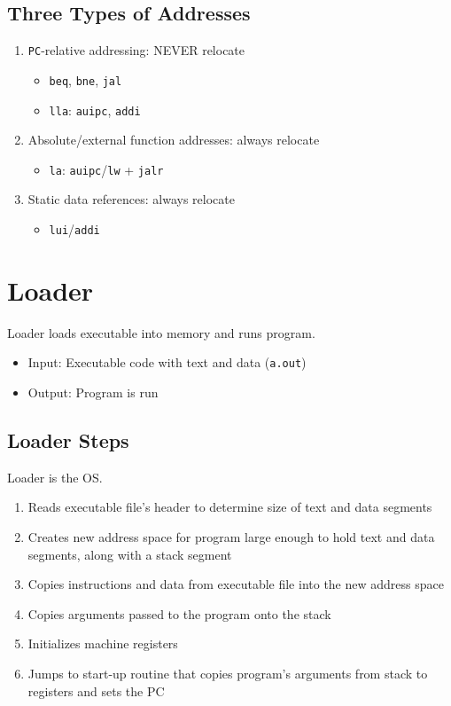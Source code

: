 \subsection{Three Types of Addresses}
\begin{enumerate}
		\item \texttt{PC}-relative addressing: NEVER relocate
			\begin{itemize}
				\item \texttt{beq}, \texttt{bne}, \texttt{jal}
				\item \texttt{lla}: \texttt{auipc}, \texttt{addi}
			\end{itemize}
		\item Absolute/external function addresses: always relocate
			\begin{itemize}
				\item \texttt{la}: \texttt{auipc}/\texttt{lw} + \texttt{jalr}
			\end{itemize}
		\item Static data references: always relocate
			\begin{itemize}
				\item \texttt{lui}/\texttt{addi}
			\end{itemize}
\end{enumerate}

\section{Loader}
Loader loads executable into memory and runs program.
\begin{itemize}
    \item Input: Executable code with text and data (\texttt{a.out})
    \item Output: Program is run
\end{itemize}

\subsection{Loader Steps}
Loader is the OS.
\begin{enumerate}
    \item Reads executable file’s header to determine size of text and data segments
    \item Creates new address space for program large enough to hold text and data segments, along with a stack segment
    \item Copies instructions and data from executable file into the new address space
    \item Copies arguments passed to the program onto the stack
    \item Initializes machine registers
    \item Jumps to start-up routine that copies program’s arguments from stack to registers and sets the PC
\end{enumerate}